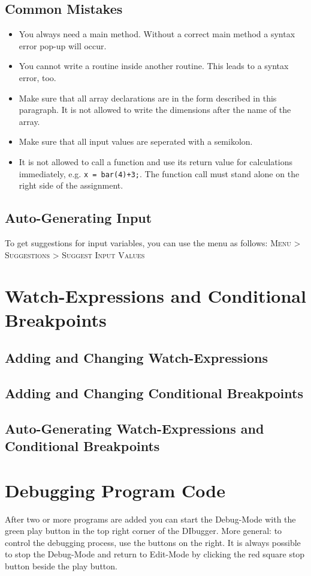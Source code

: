 \documentclass[parskip=full]{memoir}
\begin{document}
\section{Common Mistakes}
\begin{itemize}
\item You always need a main method. Without a correct main method a syntax error pop-up will occur.
\item You cannot write a routine inside another routine. This leads to a syntax error, too.
\item Make sure that all array declarations are in the form described in this paragraph. It is not allowed to write the dimensions after the name of the array.
\item Make sure that all input values are seperated with a semikolon.  
\item It is not allowed to call a function and use its return value for calculations immediately, e.g. \texttt{x = bar(4)+3;}. The function call must stand alone on the right side of the assignment. 
\end{itemize}

\section{Auto-Generating Input}
To get suggestions for input variables, you can use the menu as follows:
\textsc{Menu > Suggestions > Suggest Input Values}
\chapter{Watch-Expressions and Conditional Breakpoints} %
\section{Adding and Changing Watch-Expressions}
\section{Adding and Changing Conditional Breakpoints}
\section{Auto-Generating Watch-Expressions and Conditional Breakpoints}

\chapter{Debugging Program Code} %
After two or more programs are added you can start the Debug-Mode with the green play button in the top right corner of the DIbugger. More general: to control the debugging process, use the buttons on the right. It is always possible to stop the Debug-Mode and return to Edit-Mode by clicking the red square stop button beside the play button.
\end{document}
